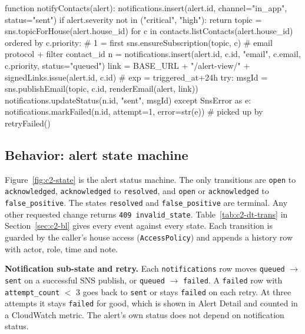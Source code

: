 \begin{Shaded}
\begin{Code}
function notifyContacts(alert):
    notifications.insert(alert.id, channel="in_app", status="sent")
    if alert.severity not in ("critical", "high"): return
    topic = sns.topicForHouse(alert.house_id)
    for c in contacts.listContacts(alert.house_id) ordered by c.priority:   # 1 = first
        sns.ensureSubscription(topic, c)                     # email protocol + filter {contact_id}
        n = notifications.insert(alert.id, c.id, "email", c.email, c.priority, status="queued")
        link = BASE_URL + "/alert-view/" + signedLinks.issue(alert.id, c.id)  # exp = triggered_at+24h
        try:
            msgId = sns.publishEmail(topic, c.id, renderEmail(alert, link))
            notifications.updateStatus(n.id, "sent", msgId)
        except SnsError as e:
            notifications.markFailed(n.id, attempt=1, error=str(e))   # picked up by retryFailed()
\end{Code}
\end{Shaded}

\subsection{Behavior: alert state machine}
Figure~\ref{fig:c2-state} is the alert status machine. The only transitions are \texttt{open} to
\texttt{acknowledged}, \texttt{acknowledged} to \texttt{resolved}, and \texttt{open} or
\texttt{acknowledged} to \texttt{false\_positive}. The states \texttt{resolved} and
\texttt{false\_positive} are terminal. Any other requested change returns \texttt{409 invalid\_state}.
Table~\ref{tab:c2-dt-trans} in Section~\ref{sec:c2-bl} gives every event against every state. Each transition is guarded by the caller's house access (\texttt{AccessPolicy}) and appends a history row with actor, role, time and note.




\textbf{Notification sub-state and retry.} Each \texttt{notifications} row moves \texttt{queued} $\rightarrow$
\texttt{sent} on a successful SNS publish, or \texttt{queued} $\rightarrow$ \texttt{failed}. A \texttt{failed}
row with \texttt{attempt\_count} $<$ 3 goes back to \texttt{sent} or stays \texttt{failed} on each retry. At three
attempts it stays \texttt{failed} for good, which is shown in Alert Detail and counted in a CloudWatch metric.
The alert's own status does not depend on notification status.

